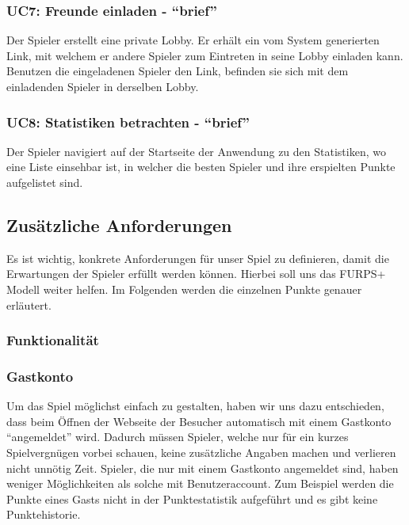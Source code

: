 \documentclass[11pt,ngerman]{article}
\newcommand{\quotes}[1]{``#1''}
\begin{document}
    \subsubsection{UC7: Freunde einladen - \quotes{brief}}
    \label{sssec:UC7Freundeeinladen}
    \begin{tcolorbox}[enhanced, breakable, sharp corners, width=\dimexpr\textwidth-15mm\relax ,enlarge left by=10mm ,fontupper=\linespread{1.1}\selectfont, boxrule=1pt, title={UC7: Freunde einladen}, colback=white, colframe=gray!22, coltitle=black]
    	Der Spieler erstellt eine private \Gls{Lobby}. Er erhält ein vom System generierten Link, mit welchem er andere Spieler zum Eintreten in seine \Gls{Lobby} einladen kann.\newline
    	Benutzen die eingeladenen Spieler den Link, befinden sie sich mit dem einladenden Spieler in derselben Lobby.
    \end{tcolorbox}

    \subsubsection{UC8: Statistiken betrachten - \quotes{brief}}
    \label{sssec:UC8Statistikenbetrachten}
    \begin{tcolorbox}[enhanced, breakable, sharp corners, width=\dimexpr\textwidth-15mm\relax ,enlarge left by=10mm ,fontupper=\linespread{1.1}\selectfont, boxrule=1pt, title={UC8: Statistiken betrachten}, colback=white, colframe=gray!22, coltitle=black]
    	Der Spieler navigiert auf der Startseite der Anwendung zu den Statistiken, wo eine Liste einsehbar ist, in welcher die besten Spieler und ihre erspielten Punkte aufgelistet sind.
    \end{tcolorbox}

    \subsection{Zusätzliche Anforderungen}
    Es ist wichtig, konkrete Anforderungen für unser Spiel zu definieren, damit die Erwartungen der Spieler erfüllt werden können. Hierbei soll uns das FURPS+ Modell weiter helfen. Im Folgenden werden die einzelnen Punkte genauer erläutert.
    \subsubsection{Funktionalität}
    \subsubsection{Gastkonto}
    Um das Spiel möglichst einfach zu gestalten, haben wir uns dazu entschieden, dass beim Öffnen der Webseite der Besucher automatisch mit einem Gastkonto \quotes{angemeldet} wird. Dadurch müssen Spieler, welche nur für ein kurzes Spielvergnügen vorbei schauen, keine zusätzliche Angaben machen und verlieren nicht unnötig Zeit. Spieler, die nur mit einem Gastkonto angemeldet sind, haben weniger Möglichkeiten als solche mit Benutzeraccount. Zum Beispiel werden die Punkte eines Gasts nicht in der Punktestatistik aufgeführt und es gibt keine Punktehistorie.
\end{document}
